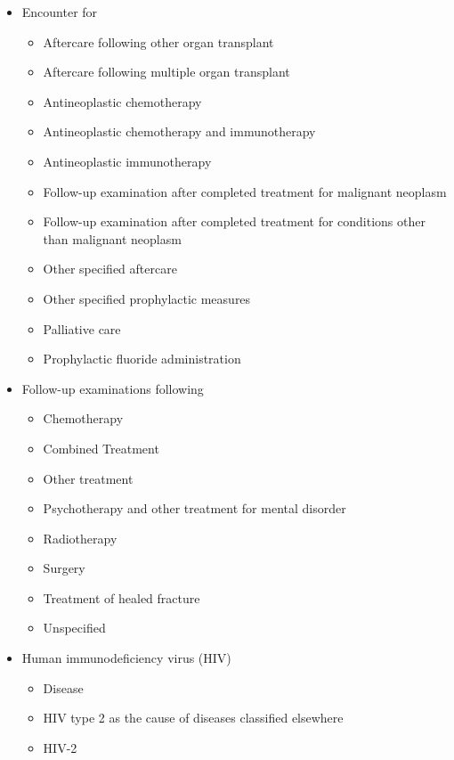 \begin{itemize}
    \item Encounter for
    \begin{itemize}
        \item Aftercare following other organ transplant
        \item Aftercare following multiple organ transplant
        \item Antineoplastic chemotherapy
        \item Antineoplastic chemotherapy and immunotherapy
        \item Antineoplastic immunotherapy
        \item Follow-up examination after completed treatment for malignant neoplasm
        \item Follow-up examination after completed treatment for conditions other than malignant neoplasm
        \item Other specified aftercare
        \item Other specified prophylactic measures
        \item Palliative care
        \item Prophylactic fluoride administration
    \end{itemize}
    
    \item Follow-up examinations following
    \begin{itemize}
        \item Chemotherapy
        \item Combined Treatment
        \item Other treatment
        \item Psychotherapy and other treatment for mental disorder
        \item Radiotherapy
        \item Surgery
        \item Treatment of healed fracture
        \item Unspecified
    \end{itemize}
    
    \item Human immunodeficiency virus (HIV)
    \begin{itemize}
        \item Disease
        \item HIV type 2 as the cause of diseases classified elsewhere
        \item HIV-2
    \end{itemize}
    

\end{itemize}
